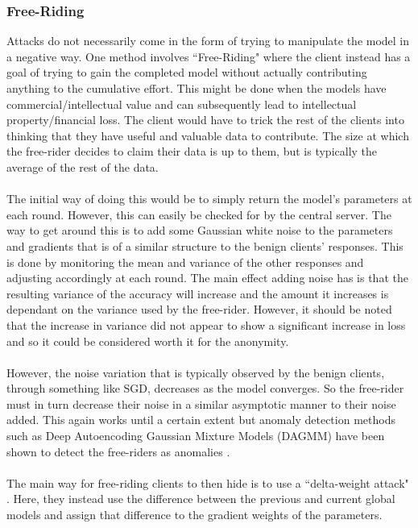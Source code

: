 \subsubsection{Free-Riding}
Attacks do not necessarily come in the form of trying to manipulate the model in a negative way. 
One method involves ``Free-Riding" \cite{free_riding} where the client instead has a goal of trying to gain the completed model without actually contributing anything to the cumulative effort. 
This might be done when the models have commercial/intellectual value and can subsequently lead to intellectual property/financial loss. 
The client would have to trick the rest of the clients into thinking that they have useful and valuable data to contribute.
The size at which the free-rider decides to claim their data is up to them, but is typically the average of the rest of the data.
\\ \\
The initial way of doing this would be to simply return the model's parameters at each round. 
However, this can easily be checked for by the central server.
The way to get around this is to add some Gaussian white noise to the parameters and gradients that is of a similar structure to the benign clients' responses.
This is done by monitoring the mean and variance of the other responses and adjusting accordingly at each round.
The main effect adding noise has is that the resulting variance of the accuracy will increase and the amount it increases is dependant on the variance used by the free-rider.
However, it should be noted that the increase in variance did not appear to show a significant increase in loss and so it could be considered worth it for the anonymity.
\\ \\
However, the noise variation that is typically observed by the benign clients, through something like SGD, decreases as the model converges.
So the free-rider must in turn decrease their noise in a similar asymptotic manner to their noise added.
This again works until a certain extent but anomaly detection methods such as Deep Autoencoding Gaussian Mixture Models (DAGMM) \cite{dagmm} have been shown to detect the free-riders as anomalies \cite{freerider_defence}.
\\ \\
The main way for free-riding clients to then hide is to use a ``delta-weight attack" \cite{freerider_defence}.
Here, they instead use the difference between the previous and current global models and assign that difference to the gradient weights of the parameters.
